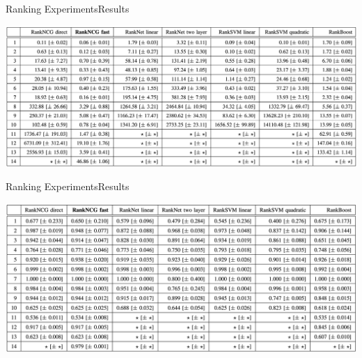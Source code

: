 \documentclass[8pt]{beamer}
\renewcommand{\|}[1][.3em]{\hspace{#1}|\hspace{#1}}
\renewcommand{\,}[1][.3em]{,\hspace{#1}}
\newlength{\wideitemsep}
\let\olditem\item
\renewcommand{\item}{\setlength{\itemsep}{\wideitemsep}\olditem}
\renewcommand{\,}{,\hspace{3pt}}
\renewcommand{\|}{\hspace{3pt}|\hspace{3pt}}
\begin{document}

\begin{frame}{Ranking Experiments}{Results}
    \begin{table}
    \centering
    \includegraphics[width=\textwidth]{results-time-over-db}
    \caption{The Mean Training Time and Standard Deviation in Seconds for the Various Methods and All the Data Sets Shown in Table \ref{tab:res_db}}\label{tab:res_time_over_db}
    \end{table}
\end{frame}

\begin{frame}{Ranking Experiments}{Results}
    \begin{table}
    \centering
    \includegraphics[width=\textwidth]{results-wmw-stat-over-db}
    \caption{The Corresponding Generalized WMW Statistic and the Standard Deviation on the Test Set for the Results Shown in Table \ref{tab:res_time_over_db}}\label{tab:res_wmw_stat_over_db}
    \end{table}
\end{frame}
\end{document}

